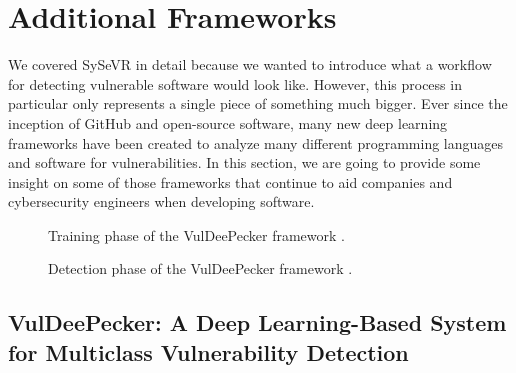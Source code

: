 \documentclass[12pt,twocolumn,letterpaper]{article}
\begin{document}
\section{Additional Frameworks}
\label{sec:additional-frameworks}

We covered SySeVR in detail because we wanted to introduce what a workflow for detecting vulnerable 
software would look like. However, this process in particular only represents a single piece of something 
much bigger. Ever since the inception of GitHub and open-source software, many new deep learning frameworks have been 
created to analyze many different programming languages and software for vulnerabilities. In this section, 
we are going to provide some insight on some of those frameworks that continue to aid companies and cybersecurity engineers 
when developing software.


\begin{figure}[h!]
    \centering

    \caption{Training phase of the VulDeePecker framework \cite{Zou21}.}
    \label{fig:af-0}
\end{figure}

\begin{figure}[h!]
    \centering

    \caption{Detection phase of the VulDeePecker framework \cite{Zou21}.}
    \label{fig:af-1}
\end{figure}

\subsection{VulDeePecker: A Deep Learning-Based System for Multiclass Vulnerability Detection}
\label{sub:vuledeepecker}
\end{document}
